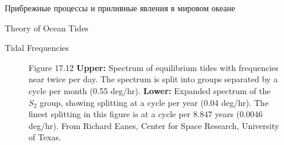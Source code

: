 \begin{chapter}{Прибрежные процессы и приливные явления в мировом океане}
\begin{section}{Theory of Ocean Tides}
\begin{paragraph}{Tidal Frequencies}
\begin{figure}[t!]
\caption{Figure 17.12 \textbf{Upper:} Spectrum of equilibrium
tides with frequencies near twice per
day. The spectrum is split into groups separated by a cycle per month
(0.55 deg/hr). \textbf{Lower:} Expanded spectrum of the $S_2$ group,
showing splitting at a cycle per year (0.04 deg/hr). The finest
splitting in this figure is at a cycle per 8.847 years (0.0046
deg/hr). From Richard Eanes, Center for Space Research, University of
Texas.}
\label{combinedtides}
\end{figure}
%


\end{paragraph}
\end{section}
\end{chapter}
